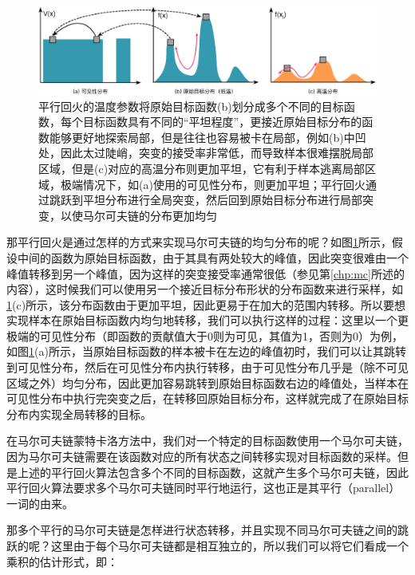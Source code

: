 \begin{figure}
\begin{fullwidth}
\includegraphics[width=1.\thewidth]{figures/mlt/parallel-tempering}
\caption{平行回火的温度参数将原始目标函数(b)划分成多个不同的目标函数，每个目标函数具有不同的“平坦程度”，更接近原始目标分布的函数能够更好地探索局部，但是往往也容易被卡在局部，例如(b)中凹处，因此太过陡峭，突变的接受率非常低，而导致样本很难摆脱局部区域，但是(c)对应的高温分布则更加平坦，它有利于样本逃离局部区域，极端情况下，如(a)使用的可见性分布，则更加平坦；平行回火通过跳跃到平坦分布进行全局突变，然后回到原始目标分布进行局部突变，以使马尔可夫链的分布更加均匀}
\label{f:mlt-parallel-tempering}
\end{fullwidth}
\end{figure}

那平行回火是通过怎样的方式来实现马尔可夫链的均匀分布的呢？如图\ref{f:mlt-parallel-tempering}所示，假设中间的函数为原始目标函数，由于其具有两处较大的峰值，因此突变很难由一个峰值转移到另一个峰值，因为这样的突变接受率通常很低（参见第\ref{chp:mc}所述的内容），这时候我们可以使用另一个接近目标分布形状的分布函数来进行采样，如\ref{f:mlt-parallel-tempering}(c)所示，该分布函数由于更加平坦，因此更易于在加大的范围内转移。所以要想实现样本在原始目标函数内均匀地转移，我们可以执行这样的过程：这里以一个更极端的可见性分布（即函数的贡献值大于0则为可见，其值为1，否则为0）为例，如图\ref{f:mlt-parallel-tempering}(a)所示，当原始目标函数的样本被卡在左边的峰值初时，我们可以让其跳转到可见性分布，然后在可见性分布内执行转移，由于可见性分布几乎是（除不可见区域之外）均匀分布，因此更加容易跳转到原始目标函数右边的峰值处，当样本在可见性分布中执行完突变之后，在转移回原始目标分布，这样就完成了在原始目标分布内实现全局转移的目标。

在马尔可夫链蒙特卡洛方法中，我们对一个特定的目标函数使用一个马尔可夫链，因为马尔可夫链需要在该函数对应的所有状态之间转移实现对目标函数的采样。但是上述的平行回火算法包含多个不同的目标函数，这就产生多个马尔可夫链，因此平行回火算法要求多个马尔可夫链同时平行地运行，这也正是其平行（parallel）一词的由来。

那多个平行的马尔可夫链是怎样进行状态转移，并且实现不同马尔可夫链之间的跳跃的呢？这里由于每个马尔可夫链都是相互独立的，所以我们可以将它们看成一个乘积的估计形式，即：

